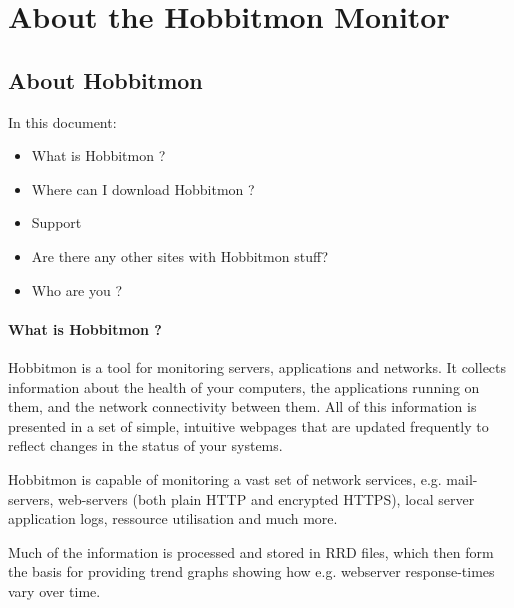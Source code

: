 \chapter{About the Hobbitmon Monitor}
\section{About Hobbitmon}


 In this document:
\begin{itemize}
\item What is Hobbitmon ?
\item Where can I download Hobbitmon ?
\item Support
\item Are there any other sites with Hobbitmon stuff?
\item Who are you ?

\end{itemize}
\subsubsection{What is Hobbitmon ?}


 Hobbitmon is a tool for monitoring servers, applications and networks. It collects information about the health of your computers, the applications running on them, and the network connectivity between them. All of this information is presented in a set of simple, intuitive webpages that are updated frequently to reflect changes in the status of your systems.


 Hobbitmon is capable of monitoring a vast set of network services, e.g. mail-servers, web-servers (both plain HTTP and encrypted HTTPS), local server application logs, ressource utilisation and much more.


 Much of the information is processed and stored in RRD files, which then form the basis for providing trend graphs showing how e.g. webserver response-times vary over time.


